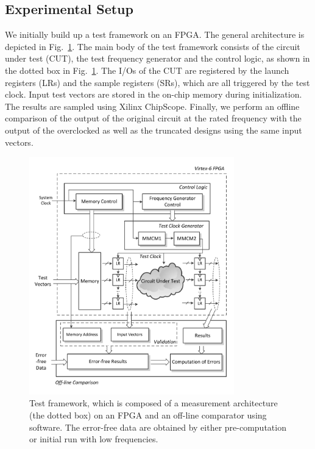 \documentclass[prodmode,acmtrets]{acmsmall} %
\begin{document}
\subsection{Experimental Setup} \label{sub:experimental_setup}
We initially build up a test framework on an FPGA. The general architecture is depicted in Fig.~\ref{Test Framework}. The main body of the test framework consists of the circuit under test (CUT), the test frequency generator and the control logic, as shown in the dotted box in Fig.~\ref{Test Framework}. The I/Os of the CUT are registered by the launch registers (LRs) and the sample registers (SRs), which are all triggered by the test clock. Input test vectors are stored in the on-chip memory during initialization. The results are sampled using Xilinx ChipScope. Finally, we perform an offline comparison of the output of the original circuit at the rated frequency with the output of the overclocked as well as the truncated designs using the same input vectors.
%
\begin{figure}[htbp]
  \centering
  \vspace{-3ex}
  \includegraphics[width=3.5in]{./Figures/TestFramework.pdf}
  \caption{Test framework, which is composed of a measurement architecture (the dotted box) on an FPGA and an off-line comparator using software. The error-free data are obtained by either pre-computation or initial run with low frequencies.}
  \label{Test Framework}
\end{figure}
\end{document}
